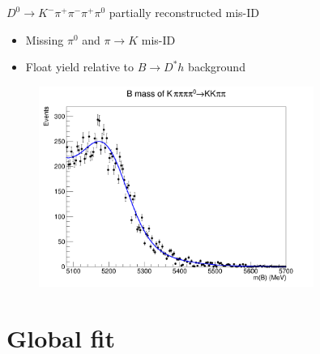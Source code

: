 \documentclass{beamer}
\begin{document}
\begin{frame}{$D^0\to K^-\pi^+\pi^-\pi^+\pi^0$ partially reconstructed mis-ID}
  \begin{itemize}
    \setlength\itemsep{0.0em}
    \item{Missing $\pi^0$ and $\pi\to K$ mis-ID}
    \item{Float yield relative to $B\to D^*h$ background}
  \end{itemize}
  \begin{figure}
    \centering
    \includegraphics[width = 0.8\textwidth]{Plots/Kpipipipi0BMassB2DpiD2Kpipipi.png}
  \end{figure}
\end{frame}

\section{Global fit}
\end{document}

